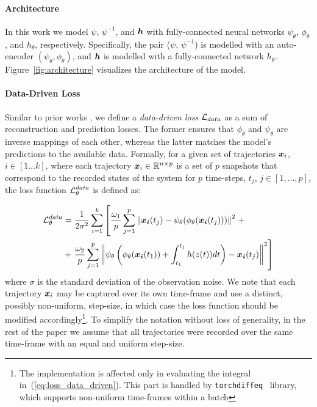 \paragraph{Architecture} In this work we model $\psi$, $\psi^{-1}$, and $\boldsymbol{h}$ with fully-connected neural networks $\psi_\theta$, $\phi_\theta$, and $h_\theta$, respectively. Specifically, the pair ($\psi$, $\psi^{-1}$) is modelled with an auto-encoder $(\psi_\theta, \phi_\theta)$, and $\boldsymbol{h}$ is modelled with a fully-connected network $h_\theta$. Figure~\ref{fig:architecture} visualizes the architecture of the model. 

\paragraph{Data-Driven Loss} Similar to prior works \cite{takeishi2017learning,morton2019deep,gin2021deep}, we define a \textit{data-driven loss} $\operatorname{\mathcal{L}}_{data}$ as a sum of reconstruction and prediction losses. The former ensures that $\phi_\theta$ and $\psi_\theta$ are inverse mappings of each other, whereas the latter matches the model's predictions to the available data. Formally, for a given set of trajectories $\boldsymbol{x}_i$, $i \in [1 \dots k]$, where each trajectory $\boldsymbol{x}_i \in \mathbb{R}^{n \times p}$ is a set of $p$ snapshots that correspond to the recorded states of the system for $p$ time-steps, $t_j$, $j \in [1, \dots, p]$, the loss function $\operatorname{\mathcal{L}}^{data}_\theta$ is defined as:

\begin{align}
    \label{eq:loss_data_driven}
    \operatorname{\mathcal{L}}^{data}_\theta & = \frac{1}{2\sigma^2}\sum_{i = 1}^k \left[\frac{\omega_1}{p}\sum_{j=1}^p\left\|\boldsymbol{x_i}(t_j) - \psi_\theta(\phi_\theta(\boldsymbol{x_i}(t_j)))\right\|^2\right. + \\
     & + \left.\frac{\omega_2}{p}\sum_{j=1}^p \left\|\psi_\theta\left(\phi_\theta(\boldsymbol{x_i}(t_1)) + \int_{t_1}^{t_j}h(z(t))dt\right) - \boldsymbol{x_i}(t_j)\right\|^2 \right]
\end{align}
where $\sigma$ is the standard deviation of the observation noise. We note that each trajectory $\boldsymbol{x}_i$ may be captured over its own time-frame and use a distinct, possibly non-uniform, step-size, in which case the loss function should be modified accordingly\footnote{The implementation is affected only in evaluating the integral in~(\ref{eq:loss_data_driven}). This part is handled by \texttt{torchdiffeq}~\cite{chen2018neural} library, which supports non-uniform time-frames within a batch}. To simplify the notation without loss of generality, in the rest of the paper we assume that all trajectories were recorded over the same time-frame with an equal and uniform step-size. 

